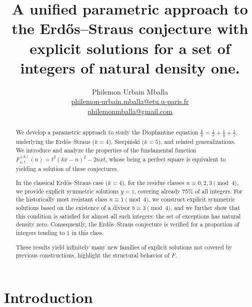 \documentclass[12pt]{article}
\title{A unified parametric approach to the Erdős–Straus conjecture with explicit solutions for a set of integers of natural density one.}
\author{Philemon Urbain Mballa \\[1ex]
\href{mailto:philemon-urbain.mballa@etu.u-paris.fr}{philemon-urbain.mballa@etu.u-paris.fr} \\
\href{mailto:philemonmballa@gmail.com}{philemonmballa@gmail.com}
}
\date{}
\begin{document}
\maketitle



\begin{abstract}
We develop a parametric approach to study the Diophantine equation 
$\frac{k}{n} = \frac{1}{x} + \frac{1}{y} + \frac{1}{z}$, underlying the 
Erdős--Straus ($k=4$), Sierpiński ($k=5$), and related generalizations. 
We introduce and analyze the properties of the fundamental function 
$F_{x,t}^{(k)}(n) = t^2(kx-n)^2 - 2nxt$, 
whose being a perfect square is equivalent to yielding a solution of these conjectures.

In the classical Erdős--Straus case ($k=4$), for the residue classes 
$n \equiv 0,2,3 \pmod{4}$, we provide explicit symmetric solutions $y=z$, 
covering already 75\% of all integers. 
For the historically most resistant class $n \equiv 1 \pmod{4}$, 
we construct explicit symmetric solutions based on the existence of a divisor 
$b \equiv 3 \pmod{4}$, and we further show that this condition 
is satisfied for almost all such integers: the set of exceptions has 
natural density zero. Consequently, the Erdős--Straus conjecture is verified 
for a proportion of integers tending to $1$ in this class.

These results yield infinitely many new families of explicit solutions not covered 
by previous constructions, highlight the structural behavior of $F$.
\end{abstract}

\section{Introduction}
\end{document}

